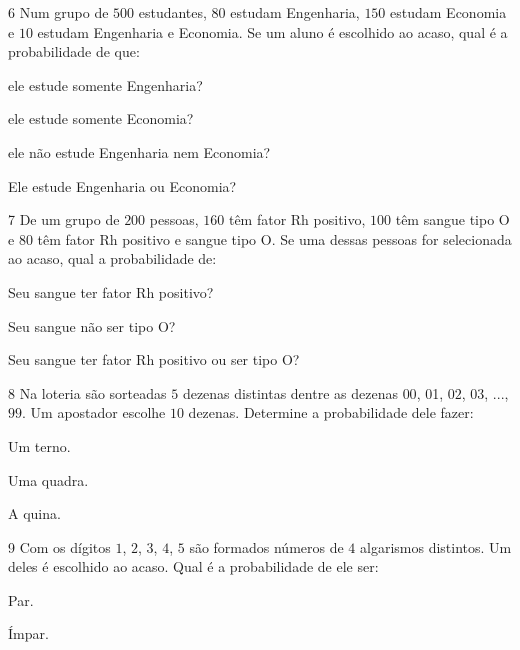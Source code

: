 {\num{6}  Num grupo de $500$ estudantes, $80$ estudam Engenharia, $150$ estudam
Economia e $10$ estudam Engenharia e Economia. Se um aluno é escolhido ao
acaso, qual é a probabilidade de que:

\begin{escolha}
\item ele estude somente Engenharia? 
\item ele estude somente Economia? 
\item ele não estude Engenharia nem Economia? 
\item Ele estude Engenharia ou Economia? 
\end{escolha}


\num{7}  De um grupo de $200$ pessoas, $160$ têm fator Rh positivo, $100$ têm sangue
tipo O e $80$ têm fator Rh positivo e sangue tipo O. Se uma dessas pessoas
for selecionada ao acaso, qual a probabilidade de:

\begin{escolha}
\item Seu sangue ter fator Rh positivo? 
\item Seu sangue não ser tipo O? 
\item Seu sangue ter fator Rh positivo ou ser tipo O? 
\end{escolha}

\num{8}  Na loteria são sorteadas $5$ dezenas distintas dentre as dezenas $00$,
01, $02$, $03$, ..., $99$. Um apostador escolhe $10$ dezenas. Determine a
probabilidade dele fazer:

\begin{escolha}
\item Um terno. 
\item Uma quadra. 
\item A quina. 
\end{escolha}

\num{9}  Com os dígitos $1$, $2$, $3$, $4$, $5$ são formados números de $4$ algarismos
distintos. Um deles é escolhido ao acaso. Qual é a probabilidade de ele
ser:

\begin{escolha}
\item Par. 
\item Ímpar. 
\end{escolha}

}
